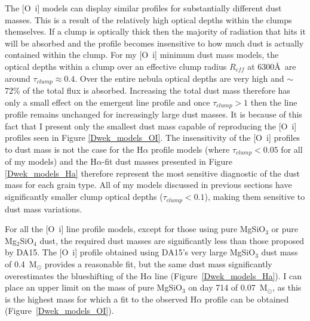 The [O~{\sc i}] models can display similar profiles for substantially 
different dust masses.  This is a result of the relatively high optical 
depths within the clumps themselves. If a clump is optically thick then 
the majority of radiation that hits it will be absorbed and the profile 
becomes insensitive to how much dust is actually contained within the 
clump.  For my [O~{\sc i}] minimum dust mass models, the optical depths 
within a clump over an effective clump radius $R_{eff}$ at 6300\AA\ are 
around $\tau_{clump} \approx 0.4$.  Over the entire nebula optical depths 
are very high and $\sim$72\% of the total flux is absorbed.  Increasing the 
total dust mass therefore has only a small effect on the emergent line 
profile and once $\tau_{clump}>1$ then the line profile remains unchanged 
for increasingly large dust masses.  It is because of this fact that I 
present only the smallest dust mass capable of reproducing the [O~{\sc i}] 
profiles seen in Figure \ref{Dwek_models_OI}.  The insensitivity of the 
[O~{\sc i}] profiles to dust mass is not the case for the H$\alpha$ 
profile models (where $\tau_{clump} < 0.05$ for all of my models) and the 
H$\alpha$-fit dust masses presented in Figure \ref{Dwek_models_Ha} 
therefore represent the most sensitive diagnostic of the dust mass for 
each grain type.  All of my models discussed in previous sections have 
significantly smaller clump optical depths ($\tau_{clump}<0.1$), making 
them sensitive to dust mass variations.

For all the [O~{\sc i}] line profile models, except for those using pure 
MgSiO$_3$ or pure Mg$_2$SiO$_4$ dust, the required dust masses are 
significantly less than those proposed by DA15. The [O~{\sc i}] profile 
obtained using DA15's very large MgSiO$_3$ dust mass of 0.4~M$_{\odot}$ 
provides a reasonable fit, but the same dust mass significantly 
overestimates the blueshifting of the H$\alpha$ line 
(Figure~\ref{Dwek_models_Ha}). I can place an upper limit on the 
mass of pure MgSiO$_3$ on day 714 of 0.07~M$_\odot$, as this 
is the highest mass for which a fit to the observed H$\alpha$ profile can 
be obtained (Figure~\ref{Dwek_models_OI}).

